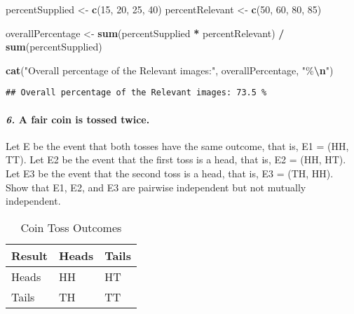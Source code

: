 \documentclass[
]{article}
\newenvironment{Shaded}{\begin{snugshade}}{\end{snugshade}}
\newcommand{\DecValTok}[1]{\textcolor[rgb]{0.00,0.00,0.81}{#1}}
\newcommand{\FunctionTok}[1]{\textcolor[rgb]{0.13,0.29,0.53}{\textbf{#1}}}
\newcommand{\NormalTok}[1]{#1}
\newcommand{\OtherTok}[1]{\textcolor[rgb]{0.56,0.35,0.01}{#1}}
\newcommand{\SpecialCharTok}[1]{\textcolor[rgb]{0.81,0.36,0.00}{\textbf{#1}}}
\newcommand{\StringTok}[1]{\textcolor[rgb]{0.31,0.60,0.02}{#1}}
\begin{document}
\begin{Shaded}
\begin{Highlighting}[]
\NormalTok{percentSupplied }\OtherTok{\textless{}{-}} \FunctionTok{c}\NormalTok{(}\DecValTok{15}\NormalTok{, }\DecValTok{20}\NormalTok{, }\DecValTok{25}\NormalTok{, }\DecValTok{40}\NormalTok{)}
\NormalTok{percentRelevant }\OtherTok{\textless{}{-}} \FunctionTok{c}\NormalTok{(}\DecValTok{50}\NormalTok{, }\DecValTok{60}\NormalTok{, }\DecValTok{80}\NormalTok{, }\DecValTok{85}\NormalTok{)}

\NormalTok{overallPercentage }\OtherTok{\textless{}{-}} \FunctionTok{sum}\NormalTok{(percentSupplied }\SpecialCharTok{*}\NormalTok{ percentRelevant) }\SpecialCharTok{/} \FunctionTok{sum}\NormalTok{(percentSupplied)}

\FunctionTok{cat}\NormalTok{(}\StringTok{"Overall percentage of the Relevant images:"}\NormalTok{, overallPercentage, }\StringTok{"\%}\SpecialCharTok{\textbackslash{}n}\StringTok{"}\NormalTok{)}
\end{Highlighting}
\end{Shaded}

\begin{verbatim}
## Overall percentage of the Relevant images: 73.5 %
\end{verbatim}

\paragraph{\texorpdfstring{\textbf{\emph{6.}} A fair coin is tossed
twice.}{6. A fair coin is tossed twice.}}\label{a-fair-coin-is-tossed-twice.}

Let E be the event that both tosses have the same outcome, that is, E1 =
(HH, TT). Let E2 be the event that the first toss is a head, that is, E2
= (HH, HT). Let E3 be the event that the second toss is a head, that is,
E3 = (TH, HH). Show that E1, E2, and E3 are pairwise independent but not
mutually independent.

\begin{table}[!t]
\caption*{
{\large Coin Toss Outcomes}
} 
\fontsize{12.0pt}{14.4pt}\selectfont
\begin{tabular*}{\linewidth}{@{\extracolsep{\fill}}lll}
\toprule
Result & Heads & Tails \\ 
\midrule\addlinespace[2.5pt]
Heads & HH & HT \\ 
Tails & TH & TT \\ 
\bottomrule
\end{tabular*}
\end{table}
\end{document}
